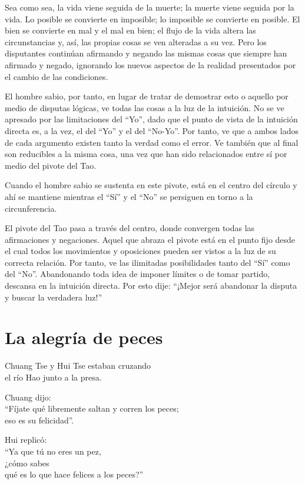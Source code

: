 \documentclass[book,b5paper,hidelinks,final]{memoir}
\begin{document}
	Sea como sea, la vida viene seguida de la muerte; la muerte viene
	seguida por la vida. Lo posible se convierte en imposible; lo imposible
	se convierte en posible. El bien se convierte en mal y el mal en bien;
	el flujo de la vida altera las circunstancias y, así, las propias cosas
	se ven alteradas a su vez. Pero los disputantes continúan afirmando y
	negando las mismas cosas que siempre han afirmado y negado, ignorando
	los nuevos aspectos de la realidad presentados por el cambio de las
	condiciones.
	
	El hombre sabio, por tanto, en lugar de tratar de demostrar esto o
	aquello por medio de disputas lógicas, ve todas las cosas a la luz de la
	intuición. No se ve apresado por las limitaciones del ``Yo'', dado que
	el punto de vista de la intuición directa es, a la vez, el del ``Yo'' y
	el del ``No-Yo''. Por tanto, ve que a ambos lados de cada argumento
	existen tanto la verdad como el error. Ve también que al final son
	reducibles a la misma cosa, una vez que han sido relacionados entre sí
	por medio del pivote del Tao.
	
	Cuando el hombre sabio se sustenta en este pivote, está en el centro del
	círculo y ahí se mantiene mientras el ``Sí'' y el ``No'' se persiguen en
	torno a la circunferencia.
	
	El pivote del Tao pasa a través del centro, donde convergen todas las
	afirmaciones y negaciones. Aquel que abraza el pivote está en el punto
	fijo desde el cual todos los movimientos y oposiciones pueden ser vistos
	a la luz de su correcta relación. Por tanto, ve las ilimitadas
	posibilidades tanto del ``Sí'' como del ``No''. Abandonando toda idea de
	imponer límites o de tomar partido, descansa en la intuición directa.
	Por esto dije: ``¡Mejor será abandonar la disputa y buscar la verdadera
	luz!''
	
	\chapter*{La alegría de peces}
	
	Chuang Tse y Hui Tse estaban cruzando\\
	el río Hao junto a la presa.
	
	Chuang dijo:\\
	``Fíjate qué libremente saltan y corren los peces;\\
	eso es su felicidad''.
	
	Hui replicó:\\
	``Ya que tú no eres un pez,\\
	¿cómo sabes\\
	qué es lo que hace felices a los peces?''
	
\end{document}
